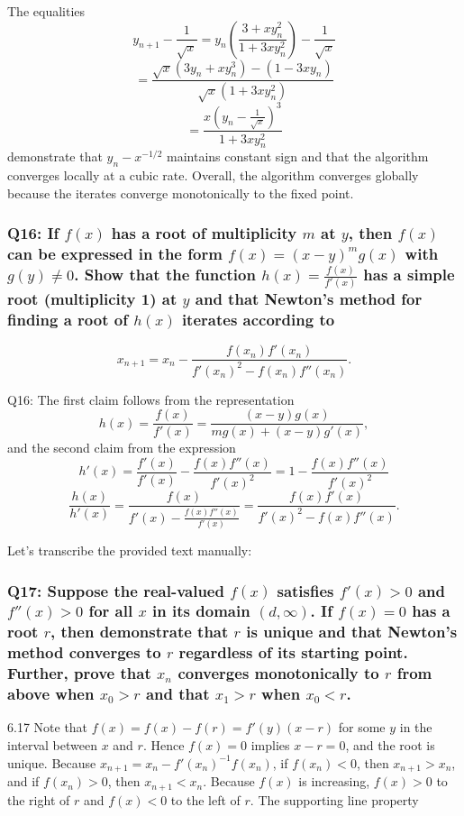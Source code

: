 \documentclass[8pt]{article}
\begin{document}
The equalities
\[
y_{n+1} - \frac{1}{\sqrt{x}} = y_n \left( \frac{3 + xy_n^2}{1 + 3xy_n^2} \right) - \frac{1}{\sqrt{x}}
\]
\[
= \frac{\sqrt{x}(3y_n + xy_n^3) - (1 - 3xy_n)}{\sqrt{x}(1 + 3xy_n^2)}
\]
\[
= \frac{x(y_n - \frac{1}{\sqrt{x}})^3}{1 + 3xy_n^2}
\]
demonstrate that \( y_n - x^{-1/2} \) maintains constant sign and that the algorithm converges locally at a cubic rate. Overall, the algorithm converges globally because the iterates converge monotonically to the fixed point.

\subsubsection*{Q16: If \( f(x) \) has a root of multiplicity \( m \) at \( y \), then \( f(x) \) can be expressed in the form \( f(x) = (x - y)^m g(x) \) with \( g(y) \neq 0 \). Show that the function \( h(x) = \frac{f(x)}{f'(x)} \) has a simple root (multiplicity 1) at \( y \) and that Newton’s method for finding a root of \( h(x) \) iterates according to}
\[
x_{n+1} = x_n - \frac{f(x_n)f'(x_n)}{f'(x_n)^2 - f(x_n)f''(x_n)}.
\]

Q16: The first claim follows from the representation
\[
h(x) = \frac{f(x)}{f'(x)} = \frac{(x - y) g(x)}{mg(x) + (x - y) g'(x)},
\]
and the second claim from the expression
\[
h'(x) = \frac{f'(x)}{f'(x)} - \frac{f(x) f''(x)}{f'(x)^2} = 1 - \frac{f(x) f''(x)}{f'(x)^2}
\]
\[
\frac{h(x)}{h'(x)} = \frac{f(x)}{f'(x) - \frac{f(x) f''(x)}{f'(x)}} = \frac{f(x) f'(x)}{f'(x)^2 - f(x) f''(x)}.
\]

Let's transcribe the provided text manually:

\subsubsection*{Q17: Suppose the real-valued \( f(x) \) satisfies \( f'(x) > 0 \) and \( f''(x) > 0 \) for all \( x \) in its domain \((d, \infty) \). If \( f(x) = 0 \) has a root \( r \), then demonstrate that \( r \) is unique and that Newton’s method converges to \( r \) regardless of its starting point. Further, prove that \( x_n \) converges monotonically to \( r \) from above when \( x_0 > r \) and that \( x_1 > r \) when \( x_0 < r \).}

6.17 Note that \( f(x) = f(x) - f(r) = f'(y)(x - r) \) for some \( y \) in the interval between \( x \) and \( r \). Hence \( f(x) = 0 \) implies \( x - r = 0 \), and the root is unique. Because \( x_{n+1} = x_n - f'(x_n)^{-1}f(x_n) \), if \( f(x_n) < 0 \), then \( x_{n+1} > x_n \), and if \( f(x_n) > 0 \), then \( x_{n+1} < x_n \). Because \( f(x) \) is increasing, \( f(x) > 0 \) to the right of \( r \) and \( f(x) < 0 \) to the left of \( r \). The supporting line property
\end{document}
